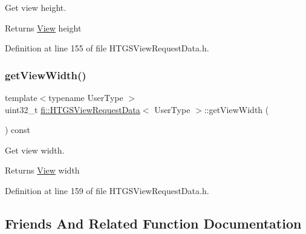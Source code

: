 Get view height. 

\begin{DoxyReturn}{Returns}
\hyperlink{classfi_1_1View}{View} height 
\end{DoxyReturn}


Definition at line 155 of file H\+T\+G\+S\+View\+Request\+Data.\+h.

\mbox{\label{classfi_1_1HTGSViewRequestData_aafef77b23d12e92405ca56602e68ddba}} 
\subsubsection{\texorpdfstring{get\+View\+Width()}{getViewWidth()}}
{\footnotesize\ttfamily template$<$typename User\+Type $>$ \\
uint32\+\_\+t \hyperlink{classfi_1_1HTGSViewRequestData}{fi\+::\+H\+T\+G\+S\+View\+Request\+Data}$<$ User\+Type $>$\+::get\+View\+Width (\begin{DoxyParamCaption}{ }\end{DoxyParamCaption}) const\hspace{0.3cm}{\ttfamily [inline]}}



Get view width. 

\begin{DoxyReturn}{Returns}
\hyperlink{classfi_1_1View}{View} width 
\end{DoxyReturn}


Definition at line 159 of file H\+T\+G\+S\+View\+Request\+Data.\+h.



\subsection{Friends And Related Function Documentation}
\mbox{\label{classfi_1_1HTGSViewRequestData_a259a7de171ef78a14053f020090588f0}} 
